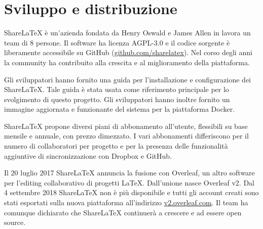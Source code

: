 \section{Sviluppo e distribuzione}
ShareLaTeX è un'azienda fondata da Henry Oswald e James Allen in lavora un team di 8 persone. Il software ha licenza AGPL-3.0 e il codice sorgente è liberamente accessibile su GitHub (\url{github.com/sharelatex}). Nel corso degli anni la community ha contribuito alla crescita e al miglioramento della piattaforma.

Gli sviluppatori hanno fornito una guida per l'installazione e configurazione dei ShareLaTeX. Tale guida è stata usata come riferimento principale per lo svolgimento di questo progetto. Gli sviluppatori hanno inoltre fornito un immagine aggiornata e funzionante del sistema per la piattaforma Docker.

ShareLaTeX propone diversi piani di abbonamento all'utente, flessibili su base mensile e annuale, con prezzo dimezzato. I vari abbonamenti differiscono per il numero di collaboratori per progetto e per la presenza delle funzionalità aggiuntive di sincronizzazione con Dropbox e GitHub.

Il 20 luglio 2017 ShareLaTeX annuncia la fusione con Overleaf, un altro software per l'editing collaborativo di progetti LaTeX. Dall'unione nasce Overleaf v2. Dal 4 settembre 2018 ShareLaTeX non è più disponibile e tutti gli account creati sono stati esportati sulla nuova piattaforma all'indirizzo \url{v2.overleaf.com}.
Il team ha comunque dichiarato che ShareLaTeX continuerà a crescere e ad essere open source.